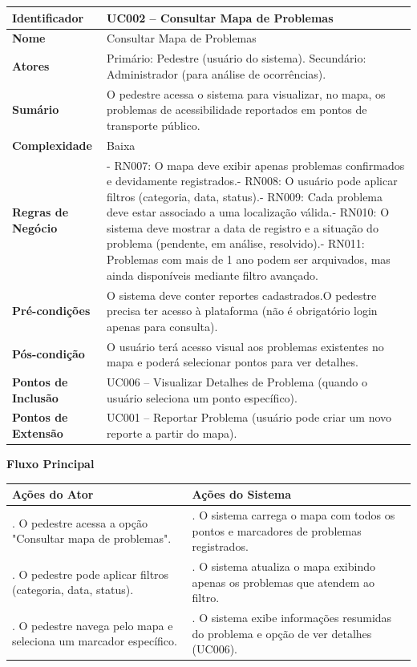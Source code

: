 \documentclass[12pt,a4paper]{article}
\begin{document}
\begin{longtable}{|p{3.5cm}|p{10cm}|}
\hline
\textbf{Identificador} & UC002 – Consultar Mapa de Problemas \\
\hline
\textbf{Nome} & Consultar Mapa de Problemas \\
\hline
\textbf{Atores} & Primário: Pedestre (usuário do sistema). \newline Secundário: Administrador (para análise de ocorrências). \\
\hline
\textbf{Sumário} & O pedestre acessa o sistema para visualizar, no mapa, os problemas de acessibilidade reportados em pontos de transporte público. \\
\hline
\textbf{Complexidade} & Baixa \\
\hline
\textbf{Regras de Negócio} & - RN007: O mapa deve exibir apenas problemas confirmados e devidamente registrados.\newline - RN008: O usuário pode aplicar filtros (categoria, data, status).\newline - RN009: Cada problema deve estar associado a uma localização válida.\newline - RN010: O sistema deve mostrar a data de registro e a situação do problema (pendente, em análise, resolvido).\newline - RN011: Problemas com mais de 1 ano podem ser arquivados, mas ainda disponíveis mediante filtro avançado. \\
\hline
\textbf{Pré-condições} & O sistema deve conter reportes cadastrados.\newline O pedestre precisa ter acesso à plataforma (não é obrigatório login apenas para consulta). \\
\hline
\textbf{Pós-condição} & O usuário terá acesso visual aos problemas existentes no mapa e poderá selecionar pontos para ver detalhes. \\
\hline
\textbf{Pontos de Inclusão} & UC006 – Visualizar Detalhes de Problema (quando o usuário seleciona um ponto específico). \\
\hline
\textbf{Pontos de Extensão} & UC001 – Reportar Problema (usuário pode criar um novo reporte a partir do mapa). \\
\hline
\end{longtable}

\textbf{Fluxo Principal}

\begin{longtable}{|>{\raggedright\arraybackslash}p{7cm}|>{\raggedright\arraybackslash}p{7cm}|}
\hline
\textbf{Ações do Ator} & \textbf{Ações do Sistema} \\
\hline
1. O pedestre acessa a opção "Consultar mapa de problemas". & 2. O sistema carrega o mapa com todos os pontos e marcadores de problemas registrados. \\
\hline
3. O pedestre pode aplicar filtros (categoria, data, status). & 4. O sistema atualiza o mapa exibindo apenas os problemas que atendem ao filtro. \\
\hline
5. O pedestre navega pelo mapa e seleciona um marcador específico. & 6. O sistema exibe informações resumidas do problema e opção de ver detalhes (UC006). \\
\hline
\end{longtable}
\end{document}
